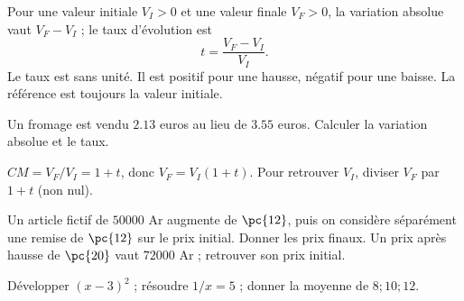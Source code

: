 \begin{keypoint}[Définition]
Pour une valeur initiale $V_I>0$ et une valeur finale $V_F>0$, la variation absolue vaut $V_F-V_I$ ; le taux d'évolution est
\[t=\frac{V_F-V_I}{V_I}.\]
Le taux est sans unité. Il est positif pour une hausse, négatif pour une baisse. La référence est toujours la valeur initiale.
\end{keypoint}
\begin{example}Un fromage est vendu $\num{2,13}$ euros au lieu de $\num{3,55}$ euros. Calculer la variation absolue et le taux.\end{example}
\begin{keypoint}
$CM=V_F/V_I=1+t$, donc $V_F=V_I(1+t)$. Pour retrouver $V_I$, diviser $V_F$ par $1+t$ (non nul).
\end{keypoint}
\begin{example}Un article fictif de $50000$ Ar augmente de $\pc{12}$, puis on considère séparément une remise de $\pc{12}$ sur le prix initial. Donner les prix finaux. Un prix après hausse de $\pc{20}$ vaut $72000$ Ar ; retrouver son prix initial.\end{example}
\begin{fluency}[5--10 min]Développer $(x-3)^2$ ; résoudre $1/x=5$ ; donner la moyenne de $8;10;12$.\end{fluency}

